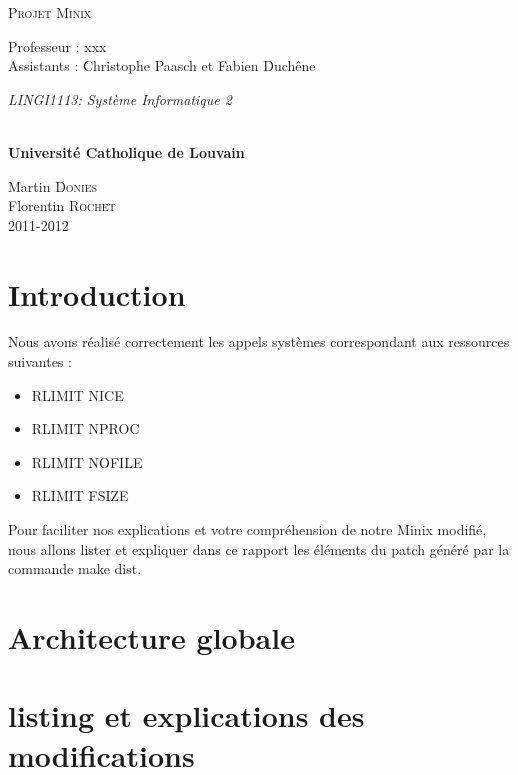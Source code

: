 \documentclass[9pt , a4paper]{article}
\begin{document}
  
  	\begin{titlepage}
		\begin{center}
			{\huge \textsc{Projet Minix}}\\
			\vspace{0.4cm}
			
			{\Large {Professeur : xxx \\ \vspace{0.2cm} Assistants : Christophe Paasch et Fabien Duchêne }}\\
			\vspace{0.6cm}
			
			{\Large \textit{ LINGI1113: Système Informatique 2}}\\
			\vspace{1.2cm}

			\texttt{}\\
			\vspace{0.2cm}
			\vspace{0.1cm}
			{\Large \textbf{Universit\'e Catholique de Louvain}}
			\vspace{0.7cm}

			\vspace{0.2cm}

			Martin \textsc{Donies} \\
			Florentin \textsc{Rochet} \\
			\vspace{0.2cm}
			2011-2012\\
		\end{center}
	\end{titlepage}

	\newpage
	
	\section{Introduction}
	
	Nous avons réalisé correctement les appels systèmes correspondant aux ressources suivantes : \\
	
	\begin{itemize}
		\item RLIMIT NICE
		\item RLIMIT NPROC
		\item RLIMIT NOFILE
		\item RLIMIT FSIZE \\
	\end{itemize}
	
	Pour faciliter nos explications et votre compréhension de notre Minix modifié, nous allons lister et expliquer dans ce rapport  les éléments du patch généré par la commande make dist.
	
	\section{Architecture globale}
	
	\section{listing et explications des modifications}
	
\end{document}
